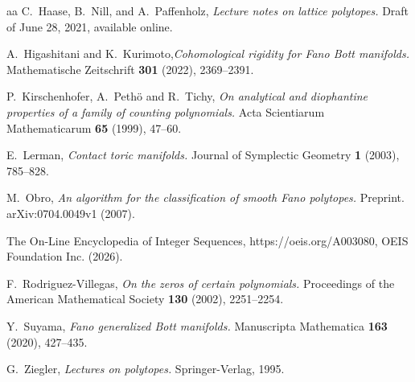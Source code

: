 \documentclass[a4paper,11pt,reqno]{amsart}
\begin{document}
\begin{thebibliography}{aa}
 C.~Haase, B.~Nill, and A.~Paffenholz, {\em Lecture notes on lattice polytopes.} Draft of June 28, 2021, available online.

 A.~Higashitani and K.~Kurimoto,{\em Cohomological rigidity for Fano Bott manifolds.} 
Mathematische Zeitschrift {\bf 301} (2022), 2369--2391.

 P.~Kirschenhofer, A.~Peth\"o and R.~Tichy, {\em On analytical and diophantine properties of a family of counting polynomials.} 
Acta Scientiarum Mathematicarum {\bf 65} (1999), 47--60.

 E.~Lerman, {\em Contact toric manifolds.} Journal of Symplectic Geometry {\bf 1} (2003), 785--828.

 M.~Obro, {\em An algorithm for the classification of smooth Fano polytopes.} Preprint. arXiv:0704.0049v1 (2007).

 The On-Line Encyclopedia of Integer Sequences, https://oeis.org/A003080, OEIS Foundation Inc. (2026).

 F.~Rodriguez-Villegas, {\em On the zeros of certain polynomials.} 
Proceedings of the American Mathematical Society {\bf 130} (2002), 2251--2254.

 Y.~Suyama, {\em Fano generalized Bott manifolds.} Manuscripta Mathematica {\bf 163} (2020), 427--435.

 G.~Ziegler, {\em Lectures on polytopes.} Springer-Verlag, 1995.

\end{thebibliography}
\end{document}
